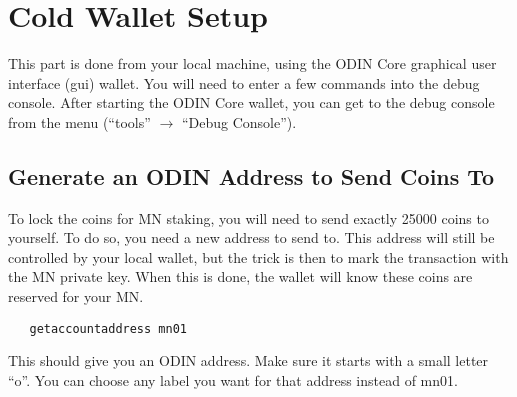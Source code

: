 \documentclass[rmp,12pt,notitlepage]{revtex4-1}
\begin{document}
\newpage
\section{Cold Wallet Setup}   
This part is done from your local machine, using the ODIN Core graphical user interface (gui) wallet. You will need to enter a few commands into the debug console.  After starting the ODIN Core wallet, you can get to the debug console from the menu (``tools'' $\rightarrow$ ``Debug Console'').
\subsection{Generate an ODIN Address to Send Coins To}
To lock the coins for MN staking, you will need to send exactly \num{25000} coins to yourself.  To do so, you need a new address to send to.  This address will still be controlled by your local wallet, but the trick is then to mark the transaction with the MN private key.  When this is done, the wallet will know these coins are reserved for your MN.
\begin{verbatim}
   getaccountaddress mn01
\end{verbatim}
This should give you an ODIN address.  Make sure it starts with a small letter ``o''.  You can choose any label you want for that address instead of mn01.  
\end{document}
